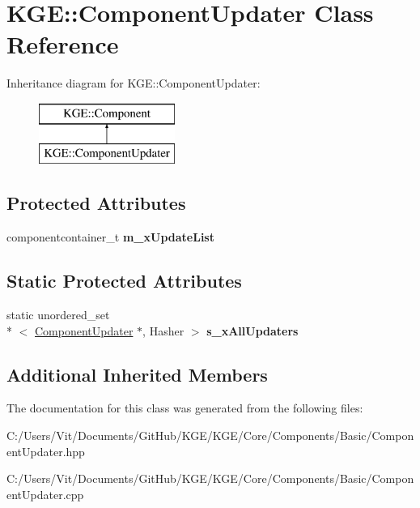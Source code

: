 \hypertarget{class_k_g_e_1_1_component_updater}{\section{K\-G\-E\-:\-:Component\-Updater Class Reference}
\label{class_k_g_e_1_1_component_updater}
}
Inheritance diagram for K\-G\-E\-:\-:Component\-Updater\-:\begin{figure}[H]
\begin{center}
\leavevmode
\includegraphics[height=2.000000cm]{class_k_g_e_1_1_component_updater}
\end{center}
\end{figure}
\subsection*{Protected Attributes}
\begin{DoxyCompactItemize}
\item 
\hypertarget{class_k_g_e_1_1_component_updater_aa2d8cfa86df1a05b5f7eb107d136a3b7}{componentcontainer\-\_\-t {\bfseries m\-\_\-x\-Update\-List}}\label{class_k_g_e_1_1_component_updater_aa2d8cfa86df1a05b5f7eb107d136a3b7}

\end{DoxyCompactItemize}
\subsection*{Static Protected Attributes}
\begin{DoxyCompactItemize}
\item 
\hypertarget{class_k_g_e_1_1_component_updater_a9aebe649bdac78f73812610046a4aa86}{static unordered\-\_\-set\\*
$<$ \hyperlink{class_k_g_e_1_1_component_updater}{Component\-Updater} $\ast$, Hasher $>$ {\bfseries s\-\_\-x\-All\-Updaters}}\label{class_k_g_e_1_1_component_updater_a9aebe649bdac78f73812610046a4aa86}

\end{DoxyCompactItemize}
\subsection*{Additional Inherited Members}


The documentation for this class was generated from the following files\-:\begin{DoxyCompactItemize}
\item 
C\-:/\-Users/\-Vit/\-Documents/\-Git\-Hub/\-K\-G\-E/\-K\-G\-E/\-Core/\-Components/\-Basic/Component\-Updater.\-hpp\item 
C\-:/\-Users/\-Vit/\-Documents/\-Git\-Hub/\-K\-G\-E/\-K\-G\-E/\-Core/\-Components/\-Basic/Component\-Updater.\-cpp\end{DoxyCompactItemize}
